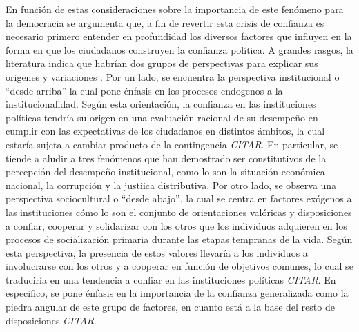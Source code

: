 \documentclass[12pt,twoside]{templates/facsothesis}
\begin{document}
En función de estas consideraciones sobre la importancia de este fenómeno para la democracia se argumenta que, a fin de revertir esta crisis de confianza es necesario primero entender en profundidad los diversos factores que influyen en la forma en que los ciudadanos construyen la confianza política. A grandes rasgos, la literatura indica que habrían dos grupos de perspectivas para explicar sus origenes y variaciones \citep{mishlerWhatAreOrigins2001, vandermeerDeeplyRootedConcern2017, zmerliPoliticalTrust2022}. Por un lado, se encuentra la perspectiva institucional o ``desde arriba'' la cual pone énfasis en los procesos endogenos a la institucionalidad. Según esta orientación, la confianza en las instituciones políticas tendría su origen en una evaluación racional de su desempeño en cumplir con las expectativas de los ciudadanos en distintos ámbitos, la cual estaría sujeta a cambiar producto de la contingencia \emph{CITAR}. En particular, se tiende a aludir a tres fenómenos que han demostrado ser constitutivos de la percepción del desempeño institucional, como lo son la situación económica nacional, la corrupción y la justiica distributiva. Por otro lado, se observa una perspectiva sociocultural o ``desde abajo'', la cual se centra en factores exógenos a las instituciones cómo lo son el conjunto de orientaciones valóricas y disposiciones a confiar, cooperar y solidarizar con los otros que los individuos adquieren en los procesos de socialización primaria durante las etapas tempranas de la vida. Según esta perspectiva, la presencia de estos valores llevaría a los individuos a involucrarse con los otros y a cooperar en función de objetivos comunes, lo cual se traduciría en una tendencia a confiar en las instituciones políticas \emph{CITAR}. En especifico, se pone énfasis en la importancia de la confianza generalizada como la piedra angular de este grupo de factores, en cuanto está a la base del resto de disposiciones \emph{CITAR}.
\end{document}
